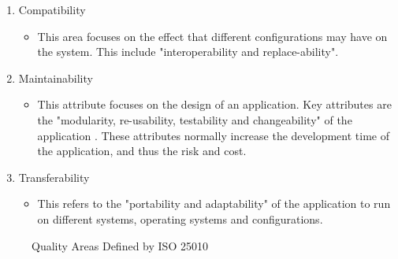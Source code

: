 \begin{enumerate}
\item Compatibility
\begin{itemize}
\item This area focuses on the effect that different configurations may have on the system. This include "interoperability and replace-ability". \parencite{iso}
\end{itemize}

\item Maintainability
\begin{itemize}
\item This attribute focuses on the design of an application. Key attributes are the "modularity, re-usability, testability and changeability" of the application \parencite{iso}. These attributes normally increase the development time of the application, and thus the risk and cost. 
\end{itemize}

\item Transferability
\begin{itemize}
\item This refers to the "portability and adaptability" of the application to run on different systems, operating systems and configurations. \parencite{iso}
\end{itemize}

\end{enumerate}
\begin{figure}[H]
\caption{Quality Areas Defined by ISO 25010}
\label{fig:iso}
\end{figure}
